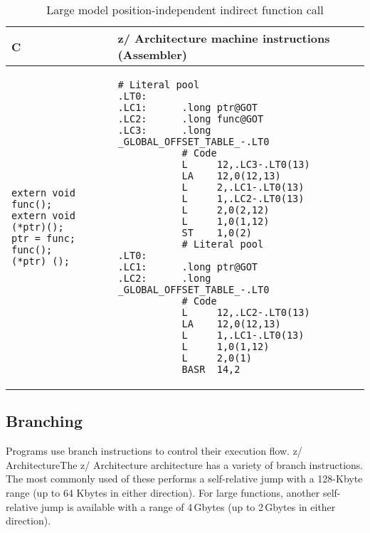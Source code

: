 \documentclass[english,11pt,twoside,toc=bib,toc=idx]{scrreprt}
\newcommand{\ARCH}{z/\kern-1pt Ar\-chi\-tec\-ture}
\newcommand{\ARCH}{ESA/390}
\newenvironment{DIFnomarkup}{}{} %
\begin{document}
\ifzseries\else
\begin{table}
  \centering
  \begin{DIFnomarkup}
  \begin{tabular}{p{}p{}}
    \toprule
    C & \ARCH{} machine instructions (Assembler) \\
    \midrule
\begin{lstlisting}[style=short]
extern void func();
extern void (*ptr)();
ptr = func;
func();
(*ptr) ();
\end{lstlisting}
    &
\begin{lstlisting}[style=short,language=simpleasm]
           # Literal pool
.LT0:
.LC1:      .long ptr@GOT
.LC2:      .long func@GOT
.LC3:      .long _GLOBAL_OFFSET_TABLE_-.LT0
           # Code
           L     12,.LC3-.LT0(13)
           LA    12,0(12,13)
           L     2,.LC1-.LT0(13)
           L     1,.LC2-.LT0(13)
           L     2,0(2,12)
           L     1,0(1,12)
           ST    1,0(2)
           # Literal pool
.LT0:
.LC1:      .long ptr@GOT
.LC2:      .long _GLOBAL_OFFSET_TABLE_-.LT0
           # Code
           L     12,.LC2-.LT0(13)
           LA    12,0(12,13)
           L     1,.LC1-.LT0(13)
           L     1,0(1,12)
           L     2,0(1)
           BASR  14,2
\end{lstlisting} \\
  \end{tabular}
  \end{DIFnomarkup}
  \caption{Large model position-independent indirect function call}
  \label{tab:fncallpiclarge}
\end{table}
\fi

\subsection{Branching}
Programs use branch instructions to control their execution flow.
{\ifzseries \ARCH{}\else The \ARCH{} architecture\fi} has a
variety of branch instructions.  The most commonly used of these
performs a self-relative jump with a 128-Kbyte range (up to 64 Kbytes
in either direction).  {\ifzseries For large functions, another
  self-relative jump is available with a range of 4$\,$Gbytes (up to
  2$\,$Gbytes in either direction).\fi}%
\end{document}
